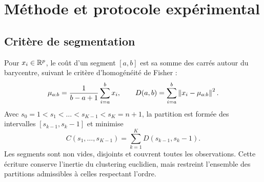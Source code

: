 \section{Méthode et protocole expérimental}
\subsection{Critère de segmentation}
Pour $x_i\in\mathbb{R}^p$, le coût d'un segment $[a,b]$ est sa somme des carrés
autour du barycentre, suivant le critère d'homogénéité de Fisher
\cite{fisher} :
\begin{equation}
 \mu_{a:b}=\frac{1}{b-a+1}\sum_{i=a}^{b}x_i,
 \qquad D(a,b)=\sum_{i=a}^{b}\left\lVert x_i-\mu_{a:b}\right\rVert^2.
 \label{eq:segment}
\end{equation}
Avec $s_0=1<s_1<\dots<s_{K-1}<s_K=n+1$, la partition est formée des
intervalles $[s_{k-1},s_k-1]$ et minimise
\begin{equation}
 C(s_1,\dots,s_{K-1})=\sum_{k=1}^{K}D(s_{k-1},s_k-1).
 \label{eq:objectif}
\end{equation}
Les segments sont non vides, disjoints et couvrent toutes les observations.
Cette écriture conserve l'inertie du clustering euclidien, mais restreint
l'ensemble des partitions admissibles à celles respectant l'ordre.
